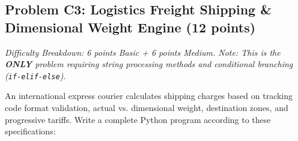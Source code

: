 \documentclass[11pt,a4paper]{article}
\begin{document}
\newpage


\subsection*{Problem C3: Logistics Freight Shipping \& Dimensional Weight Engine (12 points)}
\textit{Difficulty Breakdown: 6 points Basic + 6 points Medium. Note: This is the \textbf{ONLY} problem requiring string processing methods and conditional branching (\texttt{if-elif-else}).}

An international express courier calculates shipping charges based on tracking code format validation, actual vs. dimensional weight, destination zones, and progressive tariffs. Write a complete Python program according to these specifications:
\end{document}
